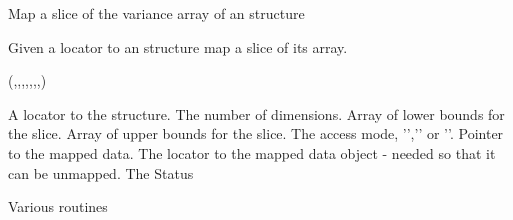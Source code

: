 \begin{manroutinedescription}
     Map a slice of the variance array of an {} structure

     Given a locator to an {} structure map a slice of its {} array.

     {}

     {} {} ({},{},{},{},{},{},{},{})

\begin{manparametertable}
 A locator %
to the {}
                       structure.
 The number of %
dimensions.
 Array of %
lower bounds
                       for the slice.
 Array of %
upper bounds
                       for the slice.
 The access %
mode,
                       '{}','{}' or '{}'.
 Pointer to the %
mapped data.
 The %
locator to the
                       mapped data object - needed so that it can
                       be unmapped.
 The Status

\end{manparametertable}
     Various {} routines
\end{manroutinedescription}

